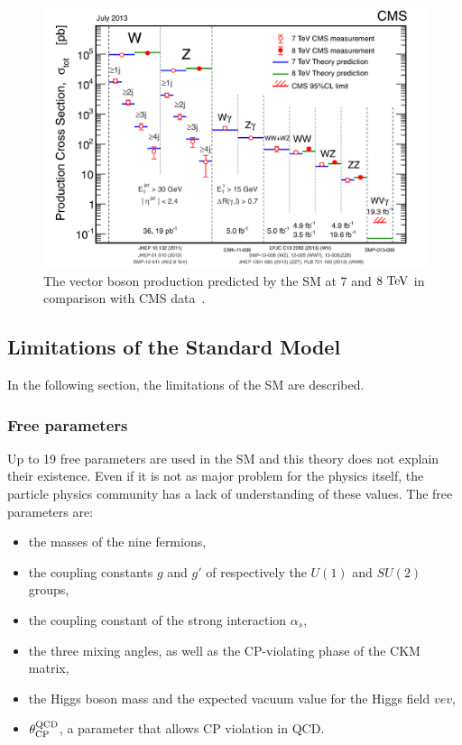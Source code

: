   \begin{figure}[!h]
    \centering
    \includegraphics[width = \textwidth]{Pictures/SM/productionXsectionSMvsCMS.png}
    \caption{The vector boson production predicted by the SM at $7$ and $8~\rm{TeV}$ in comparison with CMS data~\cite{deBoer:2013pud}.}
    \label{fig:SMvalidation}
  \end{figure}
  
    \subsection{Limitations of the Standard Model}

    In the following section, the limitations of the \gls{SM} are described.


      \subsubsection{Free parameters}

      Up to 19 free parameters are used in the \gls{SM} and this theory does not explain their existence.
      Even if it is not as major problem for the physics itself, the particle physics community has a lack of understanding of these values.
      The free parameters are: 
      \begin{itemize}
        \item the masses of the nine fermions,
        \item the coupling constants $g$ and $g'$ of respectively the $U(1)$ and $SU(2)$ groups,
        \item the coupling constant of the strong interaction $\alpha_s$,
        \item the three mixing angles, as well as the CP-violating phase of the CKM matrix,
        \item the Higgs boson mass and the expected vacuum value for the Higgs field $vev$,
        \item $\theta^{\rm{QCD}}_{\rm{CP}}$, a parameter that allows CP violation in \gls{QCD}.
      \end{itemize}

